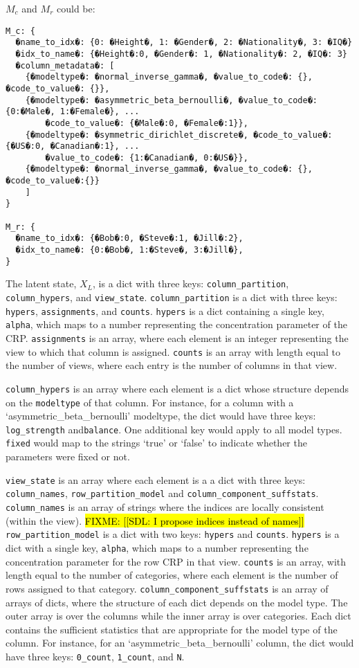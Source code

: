 \documentclass[11pt]{article}
\begin{document}
$M_c$ and $M_r$ could be:
\begin{verbatim}
M_c: {
  �name_to_idx�: {0: �Height�, 1: �Gender�, 2: �Nationality�, 3: �IQ�}
  �idx_to_name�: {�Height�:0, �Gender�: 1, �Nationality�: 2, �IQ�: 3}
  �column_metadata�: [
    {�modeltype�: �normal_inverse_gamma�, �value_to_code�: {}, �code_to_value�: {}},
    {�modeltype�: �asymmetric_beta_bernoulli�, �value_to_code�: {0:�Male�, 1:�Female�}, ...
    	�code_to_value�: {�Male�:0, �Female�:1}},
    {�modeltype�: �symmetric_dirichlet_discrete�, �code_to_value�: {�US�:0, �Canadian�:1}, ...
    	�value_to_code�: {1:�Canadian�, 0:�US�}},
    {�modeltype�: �normal_inverse_gamma�, �value_to_code�: {}, �code_to_value�:{}}
    ]
}

M_r: {
  �name_to_idx�: {�Bob�:0, �Steve�:1, �Jill�:2},
  �idx_to_name�: {0:�Bob�, 1:�Steve�, 3:�Jill�},
}
\end{verbatim}

The latent state, $X_L$, is a dict with three keys:  
\texttt{column\_partition},
\texttt{column\_hypers}, and
\texttt{view\_state}.
%
\texttt{column\_partition} is a dict with three keys: \texttt{hypers}, \texttt{assignments}, and \texttt{counts}.
\texttt{hypers} is a dict containing a single key, \texttt{alpha}, which maps to a number representing the concentration parameter of the CRP. \texttt{assignments} is an array, where each element is an integer representing the view to which that column is assigned. \texttt{counts} is an array with length equal to the number of views, where each entry is the number of columns in that view. 

\texttt{column\_hypers} is an array where each element is a dict whose structure depends on the \texttt{modeltype} of that column. For instance, for a column with a `asymmetric\_beta\_bernoulli' modeltype, the dict would have three keys: \texttt{log\_strength} and\texttt{balance}. One additional key would apply to all model types. \texttt{fixed} would map to the strings `true' or `false' to indicate whether the parameters were fixed or not.

\texttt{view\_state} is an array where each element is a a dict with three keys: \texttt{column\_names}, \texttt{row\_partition\_model} and \texttt{column\_component\_suffstats}. 
\texttt{column\_names} is an array of strings where the indices are locally consistent (within the view). \hl{FIXME: [[SDL: I propose indices instead of names]]}
\texttt{row\_partition\_model} is a dict with two keys: \texttt{hypers} and \texttt{counts}. \texttt{hypers} is a dict with a single key, \texttt{alpha}, which maps to a number representing the concentration parameter for the row CRP in that view. \texttt{counts} is an array, with length equal to the number of categories, where each element is the number of rows assigned to that category.
%
\texttt{column\_component\_suffstats} is an array of arrays of dicts, where the structure of each dict depends on the model type. The outer array is over the columns while the inner array is over categories. Each dict contains the sufficient statistics that are appropriate for the model type of the column.  For instance, for an `asymmetric\_beta\_bernoulli' column, the dict would have three keys: \texttt{0\_count}, \texttt{1\_count}, and \texttt{N}.
\end{document}
